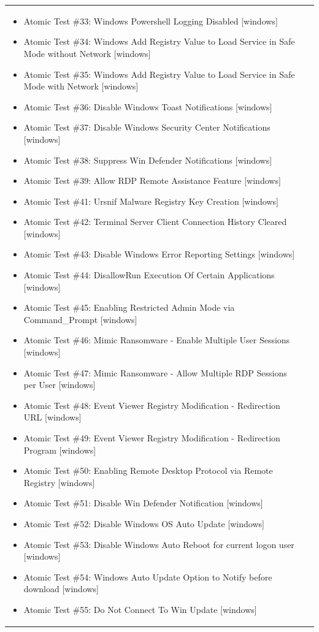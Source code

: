 \begin{longtable}{p{} p{}}
\begin{itemize}[leftmargin=*, nosep, topsep=0pt]
  \item Atomic Test \#33: Windows Powershell Logging Disabled [windows]
  \item Atomic Test \#34: Windows Add Registry Value to Load Service in Safe Mode without Network [windows]
  \item Atomic Test \#35: Windows Add Registry Value to Load Service in Safe Mode with Network [windows]
  \item Atomic Test \#36: Disable Windows Toast Notifications [windows]
  \item Atomic Test \#37: Disable Windows Security Center Notifications [windows]
  \item Atomic Test \#38: Suppress Win Defender Notifications [windows]
  \item Atomic Test \#39: Allow RDP Remote Assistance Feature [windows]
  \item Atomic Test \#41: Ursnif Malware Registry Key Creation [windows]
  \item Atomic Test \#42: Terminal Server Client Connection History Cleared [windows]
  \item Atomic Test \#43: Disable Windows Error Reporting Settings [windows]
  \item Atomic Test \#44: DisallowRun Execution Of Certain Applications [windows]
  \item Atomic Test \#45: Enabling Restricted Admin Mode via Command\_Prompt [windows]
  \item Atomic Test \#46: Mimic Ransomware - Enable Multiple User Sessions [windows]
  \item Atomic Test \#47: Mimic Ransomware - Allow Multiple RDP Sessions per User [windows]
  \item Atomic Test \#48: Event Viewer Registry Modification - Redirection URL [windows]
  \item Atomic Test \#49: Event Viewer Registry Modification - Redirection Program [windows]
  \item Atomic Test \#50: Enabling Remote Desktop Protocol via Remote Registry [windows]
  \item Atomic Test \#51: Disable Win Defender Notification [windows]
  \item Atomic Test \#52: Disable Windows OS Auto Update [windows]
  \item Atomic Test \#53: Disable Windows Auto Reboot for current logon user [windows]
  \item Atomic Test \#54: Windows Auto Update Option to Notify before download [windows]
  \item Atomic Test \#55: Do Not Connect To Win Update [windows]

\end{itemize}
\end{longtable}
